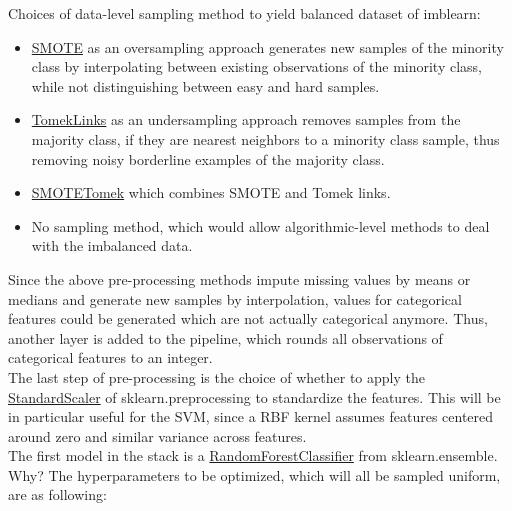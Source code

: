 \documentclass[11pt]{article}
\begin{document}
Choices of data-level sampling method to yield balanced dataset of imblearn:
\begin{itemize}
\item \href{https://imbalanced-learn.org/stable/references/generated/imblearn.over_sampling.SMOTE.html}{SMOTE} as an oversampling approach generates new samples of the minority class by interpolating between existing observations of the minority class, while not distinguishing between easy and hard samples. 
\item \href{https://imbalanced-learn.org/stable/references/generated/imblearn.under_sampling.TomekLinks.html}{TomekLinks} as an undersampling approach removes samples from the majority class, if they are nearest neighbors to a minority class sample, thus removing noisy borderline examples of the majority class. 
\item \href{https://imbalanced-learn.org/stable/references/generated/imblearn.combine.SMOTETomek.html}{SMOTETomek} which combines SMOTE and Tomek links.
\item No sampling method, which would allow algorithmic-level methods to deal with the imbalanced data. 
\end{itemize}

Since the above pre-processing methods impute missing values by means or medians and generate new samples by interpolation, values for categorical features could be generated which are not actually categorical anymore. Thus, another layer is added to the pipeline, which rounds all observations of categorical features to an integer. \\ 

The last step of pre-processing is  the choice of whether to apply the \href{https://scikit-learn.org/stable/modules/generated/sklearn.preprocessing.StandardScaler.html}{StandardScaler} of sklearn.preprocessing to standardize the features. This will be in particular useful for the SVM, since a RBF kernel assumes features centered around zero and similar variance across features. \\

The first model in the stack is a \href{https://scikit-learn.org/stable/modules/generated/sklearn.ensemble.RandomForestClassifier.html}{RandomForestClassifier} from sklearn.ensemble. Why? The hyperparameters to be optimized, which will all be sampled uniform, are as following:
\end{document}
